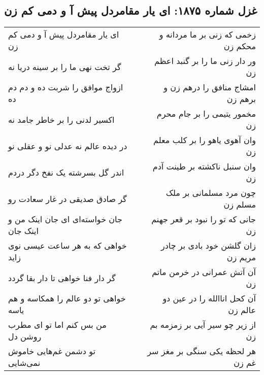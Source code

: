 \begin{center}
\section*{غزل شماره ۱۸۷۵: ای یار مقامردل پیش آ و دمی کم زن}
\label{sec:1875}
\begin{longtable}{l p{0.5cm} r}
ای یار مقامردل پیش آ و دمی کم زن
&&
زخمی که زنی بر ما مردانه و محکم زن
\\
گر تخت نهی ما را بر سینه دریا نه
&&
ور دار زنی ما را بر گنبد اعظم زن
\\
ازواج موافق را شربت ده و دم دم ده
&&
امشاج منافق را درهم زن و برهم زن
\\
اکسیر لدنی را بر خاطر جامد نه
&&
مخمور یتیمی را بر جام محرم زن
\\
در دیده عالم نه عدلی نو و عقلی نو
&&
وان آهوی یاهو را بر کلب معلم زن
\\
اندر گل بسرشته یک نفخ دگر دردم
&&
وان سنبل ناکشته بر طینت آدم زن
\\
گر صادق صدیقی در غار سعادت رو
&&
چون مرد مسلمانی بر ملک مسلم زن
\\
جان خواسته‌ای ای جان اینک من و اینک جان
&&
جانی که تو را نبود بر قعر جهنم زن
\\
خواهی که به هر ساعت عیسی نوی زاید
&&
زان گلشن خود بادی بر چادر مریم زن
\\
گر دار فنا خواهی تا دار بقا گردد
&&
آن آتش عمرانی در خرمن ماتم زن
\\
خواهی تو دو عالم را همکاسه و هم یاسه
&&
آن کحل اناالله را در عین دو عالم زن
\\
من بس کنم اما تو ای مطرب روشن دل
&&
از زیر چو سیر آیی بر زمزمه بم زن
\\
تو دشمن غم‌هایی خاموش نمی‌شایی
&&
هر لحظه یکی سنگی بر مغز سر غم زن
\\
\end{longtable}
\end{center}
